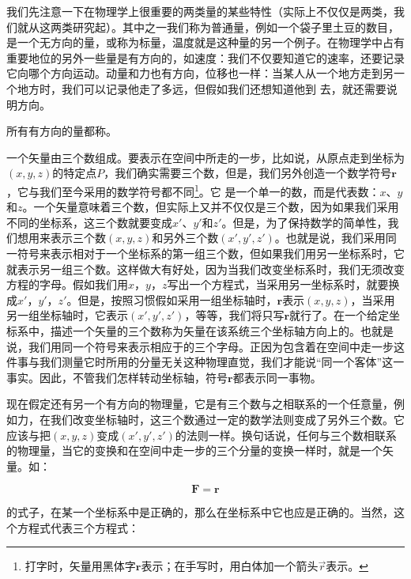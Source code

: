 \documentclass[12pt,oneside]{book}
\providecommand{\FLPvec}[1]{\boldsymbol{#1}}
\providecommand{\FLPF}[0]{\FLPvec{F}}
\providecommand{\FLPr}[0]{\FLPvec{r}}
\begin{document}
我们先注意一下在物理学上很重要的两类量的某些特性（实际上不仅仅是两类，我们就从这两类研究起）。其中之一我们称为普通量，例如一个袋子里土豆的数目，是一个无方向的量，或称为标量，温度就是这种量的另一个例子。在物理学中占有重要地位的另外一些量是有方向的，如速度：我们不仅要知道它的速率，还要记录它向哪个方向运动。动量和力也有方向，位移也一样：当某人从一个地方走到另一个地方时，我们可以记录他走了多远，但假如我们还想知道他到 去，就还需要说明方向。

所有有方向的量都称。

一个矢量由三个数组成。要表示在空间中所走的一步，比如说，从原点走到坐标为$(x, y, z)$的特定点$P$，我们确实需要三个数，但是，我们另外创造一个数学符号$\boldsymbol{r}$，它与我们至今采用的数学符号都不同\footnote{打字时，矢量用黑体字$\boldsymbol{r}$表示；在手写时，用白体加一个箭头$ \vec{r}$表示。}。它 是一个单一的数，而是代表数：$x$、$y$和$z$。一个矢量意味着三个数，但实际上又并不仅仅是三个数，因为如果我们采用不同的坐标系，这三个数就要变成$x'$、$y'$和$z'$。但是，为了保持数学的简单性，我们想用来表示三个数$(x, y, z)$和另外三个数$(x', y', z')$。也就是说，我们采用同一符号来表示相对于一个坐标系的第一组三个数，但如果我们用另一坐标系时，它就表示另一组三个数。这样做大有好处，因为当我们改变坐标系时，我们无须改变方程的字母。假如我们用$x$，$y$，$z$写出一个方程式，当采用另一坐标系时，就要换成$x'$，$y'$，$z'$。但是，按照习惯假如采用一组坐标轴时，$\boldsymbol{r}$表示$(x, y, z)$，当采用另一组坐标轴时，它表示$(x', y', z')$，等等，我们将只写$\boldsymbol{r}$就行了。在一个给定坐标系中，描述一个矢量的三个数称为矢量在该系统三个坐标轴方向上的。也就是说，我们用同一个符号来表示相应于的三个字母。正因为包含着在空间中走一步这件事与我们测量它时所用的分量无关这种物理直觉，我们才能说“同一个客体”这一事实。因此，不管我们怎样转动坐标轴，符号$\boldsymbol{r}$都表示同一事物。


现在假定还有另一个有方向的物理量，它是有三个数与之相联系的一个任意量，例如力，在我们改变坐标轴时，这三个数通过一定的数学法则变成了另外三个数。它应该与把$(x, y, z)$变成$(x', y', z')$的法则一样。换句话说，任何与三个数相联系的物理量，当它的变换和在空间中走一步的三个分量的变换一样时，就是一个矢量。如：

\begin{equation*}
\FLPF=\FLPr
\end{equation*}

的式子，在某一个坐标系中是正确的，那么在坐标系中它也应是正确的。当然，这个方程式代表三个方程式：
\end{document}

